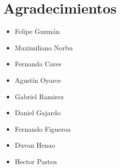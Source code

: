 \section{Agradecimientos}
\begin{multicols}{3}
    \begin{itemize}
        \item Felipe Guzmán

        \item Maximiliano Norbu

        \item Fernanda Cares

        \item Agustín Oyarce

        \item Gabriel Ramirez

        \item Daniel Gajardo

        \item Fernando Figueroa

        \item Duvan Henao

        \item Hector Pasten
    \end{itemize}
\end{multicols}

